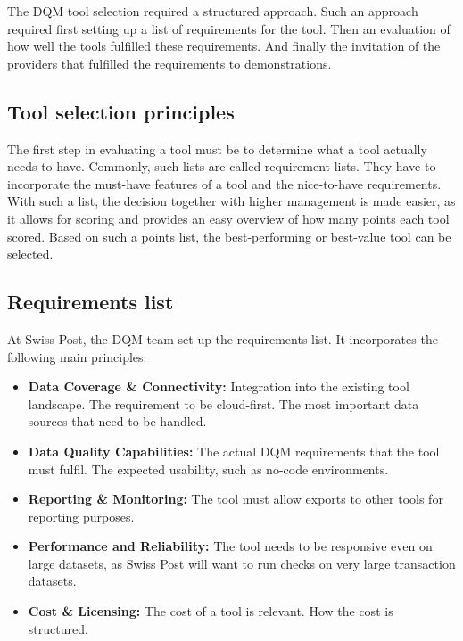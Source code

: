 The DQM tool selection required a structured approach. Such an approach required first setting up a list of requirements for the tool. Then an evaluation of how well the tools fulfilled these requirements. And finally the invitation of the providers that fulfilled the requirements to demonstrations.

\subsection*{Tool selection principles}

The first step in evaluating a tool must be to determine what a tool actually needs to have. Commonly, such lists are called requirement lists. They have to incorporate the must-have features of a tool and the nice-to-have requirements. With such a list, the decision together with higher management is made easier, as it allows for scoring and provides an easy overview of how many points each tool scored. Based on such a points list, the best-performing or best-value tool can be selected.

\subsection*{Requirements list}

At Swiss Post, the \gls{DQM} team set up the requirements list. It incorporates the following main principles:

\begin{itemize}
    \item \textbf{Data Coverage \& Connectivity:} Integration into the existing tool landscape. The requirement to be cloud-first. The most important data sources that need to be handled.
    \item \textbf{Data Quality Capabilities:} The actual DQM requirements that the tool must fulfil. The expected usability, such as no-code environments.
    \item \textbf{Reporting \& Monitoring:} The tool must allow exports to other tools for reporting purposes.
    \item \textbf{Performance and Reliability:} The tool needs to be responsive even on large datasets, as Swiss Post will want to run checks on very large transaction datasets.
    \item \textbf{Cost \& Licensing:} The cost of a tool is relevant. How the cost is structured.
\end{itemize}



